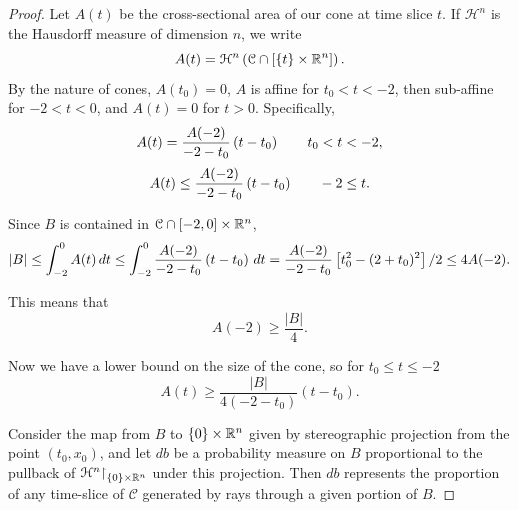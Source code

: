 \begin{proof}
Let $A(t)$ be the cross-sectional area of our cone at time slice $t$.  If $\mathcal{H}^n$ is the Hausdorff measure of dimension $n$, we write
\[ A(t) = \mathcal{H}^n\left( \mathcal{C} \cap \left[ \{t\}\times \mathbb{R}^n \right] \right). \]
By the nature of cones, $A(t_0)=0$, $A$ is affine for $t_0 < t < -2$, then sub-affine for $-2<t<0$, and $A(t)=0$ for $t > 0$.  Specifically,
\[ A(t) = \frac{A(-2)}{-2-t_0} \left( t-t_0 \right) \qquad t_0 < t < -2, \]
\[ A(t) \leq \frac{A(-2)}{-2-t_0} \left( t-t_0 \right) \qquad -2 \leq t. \]


Since $B$ is contained in $\mathcal{C} \cap [-2,0]\times \mathbb{R}^n$, 
\[ |B| \leq \int_{-2}^0 A(t) \,dt \leq \int_{-2}^0 \frac{A(-2)}{-2-t_0}\left( t-t_0 \right) \,dt = \frac{A(-2)}{-2-t_0} \left[ t_0^2 - (2+t_0)^2 \right]/2 \leq 4 A(-2). \]

This means that 
\[ A(-2) \geq \frac{|B|}{4}. \]

Now we have a lower bound on the size of the cone, so for $t_0 \leq t \leq -2$
\begin{equation}\label{lower_bound_on_A} 
A(t) \geq \frac{|B|}{4(-2-t_0)}(t - t_0). 
\end{equation}

%

Consider the map from $B$ to $\{0\}\times\mathbb{R}^n$ given by stereographic projection from the point $(t_0,x_0)$, and let $db$ be a probability measure on $B$ proportional to the pullback of $\mathcal{H}^n {\upharpoonright}_{\{0\}\times\mathbb{R}^n}$ under this projection.  %
Then $db$ represents the proportion of any time-slice of $\mathcal{C}$ generated by rays through a given portion of $B$.  


\end{proof}
